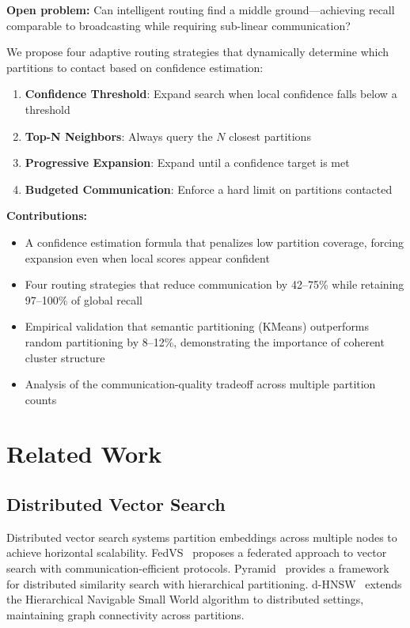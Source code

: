 \documentclass[10pt,twocolumn]{article}
\begin{document}
\textbf{Open problem:} Can intelligent routing find a middle ground---achieving recall comparable to broadcasting while requiring sub-linear communication?

We propose four adaptive routing strategies that dynamically determine which partitions to contact based on confidence estimation:

\begin{enumerate}
    \item \textbf{Confidence Threshold}: Expand search when local confidence falls below a threshold
    \item \textbf{Top-N Neighbors}: Always query the $N$ closest partitions
    \item \textbf{Progressive Expansion}: Expand until a confidence target is met
    \item \textbf{Budgeted Communication}: Enforce a hard limit on partitions contacted
\end{enumerate}

\textbf{Contributions:}
\begin{itemize}
    \item A confidence estimation formula that penalizes low partition coverage, forcing expansion even when local scores appear confident
    \item Four routing strategies that reduce communication by 42--75\% while retaining 97--100\% of global recall
    \item Empirical validation that semantic partitioning (KMeans) outperforms random partitioning by 8--12\%, demonstrating the importance of coherent cluster structure
    \item Analysis of the communication-quality tradeoff across multiple partition counts
\end{itemize}

\section{Related Work}

\subsection{Distributed Vector Search}

Distributed vector search systems partition embeddings across multiple nodes to achieve horizontal scalability. FedVS~\cite{fedvs} proposes a federated approach to vector search with communication-efficient protocols. Pyramid~\cite{pyramid} provides a framework for distributed similarity search with hierarchical partitioning. d-HNSW~\cite{dhnsw} extends the Hierarchical Navigable Small World algorithm to distributed settings, maintaining graph connectivity across partitions.
\end{document}
